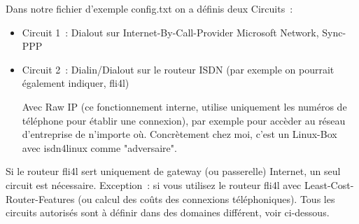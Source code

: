   Dans notre fichier d'exemple config.txt on a définis deux Circuits~:

\begin{itemize}
\item Circuit 1~: Dialout sur Internet-By-Call-Provider Microsoft Network, Sync-PPP

\item Circuit 2~: Dialin/Dialout sur le routeur ISDN (par exemple on pourrait
également indiquer, fli4l)

  Avec Raw IP (ce fonctionnement interne, utilise uniquement les numéros de
  téléphone pour établir une connexion), par exemple pour accèder au réseau
  d'entreprise de n'importe où. Concrètement chez moi, c'est un Linux-Box avec
  isdn4linux comme "adversaire".
\end{itemize}

  Si le routeur fli4l sert uniquement de gateway (ou passerelle) Internet, un seul
  circuit est nécessaire. Exception~: si vous utilisez le routeur fli4l avec
  Least-Cost-Router-Features (ou calcul des coûts des connexions téléphoniques).
  Tous les circuits autorisés sont à définir dans des domaines différent,
  voir ci-dessous.

